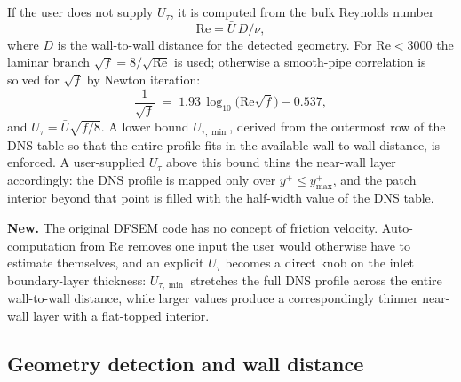 \documentclass[
 amsmath,amssymb,
 aps,
 twocolumn,
]{revtex4-2}
\newcommand{\improv}[1]{\par\medskip\noindent\textbf{#1}\hspace{0.5em}\ignorespaces}
\begin{document}
If the user does not supply $U_\tau$, it is computed from the bulk
Reynolds number
\begin{equation}\label{eq:Re}
  \mathrm{Re} = \bar U\,D/\nu,
\end{equation}
where $D$ is the wall-to-wall distance for the detected geometry. For
$\mathrm{Re}<3000$ the laminar branch
$\sqrt{f}=8/\sqrt{\mathrm{Re}}$ is used; otherwise a smooth-pipe
correlation is solved for $\sqrt f$ by Newton iteration:
\begin{equation}\label{eq:Colebrook}
  \frac{1}{\sqrt f} \;=\; 1.93\,\log_{10}\!\bigl(\mathrm{Re}\sqrt f\bigr) - 0.537,
\end{equation}
and $U_\tau = \bar U\sqrt{f/8}$. A lower bound $U_{\tau,\min}$, derived
from the outermost row of the DNS table so that the entire profile fits
in the available wall-to-wall distance, is enforced. A user-supplied
$U_\tau$ above this bound thins the near-wall layer accordingly: the DNS
profile is mapped only over $y^+\le y_{\max}^+$, and the patch interior
beyond that point is filled with the half-width value of the DNS table.

\improv{New.}
The original DFSEM code has no concept of friction velocity. Auto-computation
from $\mathrm{Re}$ removes one input the user would otherwise have to
estimate themselves, and an explicit $U_\tau$ becomes a direct knob on
the inlet boundary-layer thickness: $U_{\tau,\min}$ stretches the full
DNS profile across the entire wall-to-wall distance, while larger values
produce a correspondingly thinner near-wall layer with a flat-topped
interior.

\subsection{Geometry detection and wall distance}\label{sec:geometry}
\end{document}
